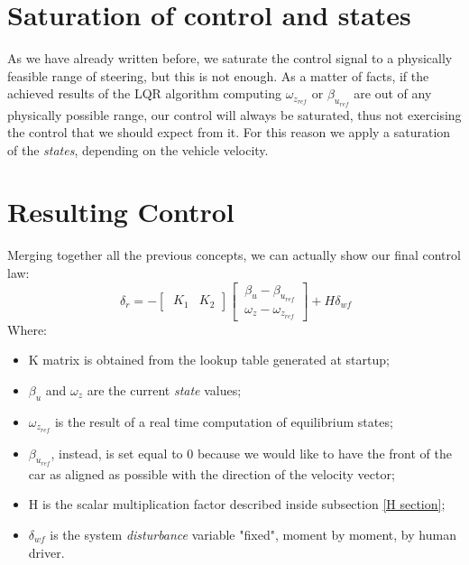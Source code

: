 \section{Saturation of control and states}
As we have already written before, we saturate the control signal to a physically feasible range of steering, but this is not enough. As a matter of facts, if the achieved results of the LQR algorithm computing $\omega_{z_{ref}}$ or $\beta_{u_{ref}}$ are out of any physically possible range, our control will always be saturated, thus not exercising the control that we should expect from it. For this reason we apply a saturation of the \textit{states}, depending on the vehicle velocity.
\section{Resulting Control}
 Merging together all the previous concepts, we can actually show our final control law:
\begin{equation} \label{Resulting Control}
	\ \delta_{r} = -
	\begin{bmatrix}
	\ K_{1} & K_{2}
	\end{bmatrix}
	\begin{bmatrix}
	\ \beta_{u}-\beta_{u_{ref}} \\
	\ \omega_{z}-\omega_{z_{ref}}
	\end{bmatrix} +
	H \delta_{wf}
\end{equation}
Where:
\begin{itemize}
	\item K matrix is obtained from the lookup table generated at startup;
	\item $\beta_{u}$ and $\omega_{z}$ are the current \textit{state} values;
	\item $\omega_{z_{ref}}$ is the result of a real time computation of equilibrium states;
	\item $\beta_{u_{ref}}$, instead, is set equal to 0 because we would like to have the front of the car as aligned as possible with the direction of the velocity vector;
	\item H is the scalar multiplication factor described inside subsection \ref{H section};
	\item $\delta_{wf}$ is the system \textit{disturbance} variable "fixed", moment by moment, by human driver.
\end{itemize}
